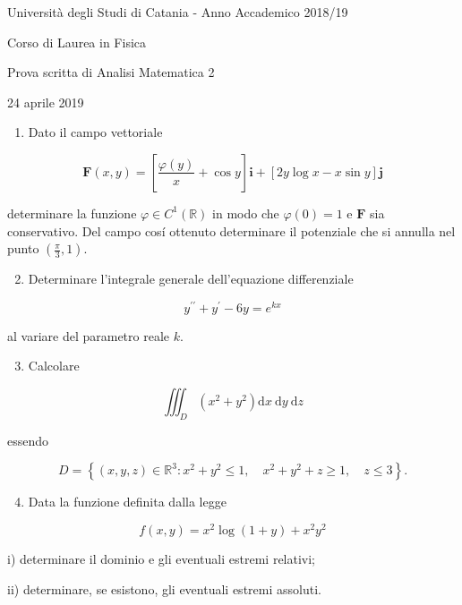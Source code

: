 \documentclass[10pt]{article}
\begin{document}
Università degli Studi di Catania - Anno Accademico 2018/19

Corso di Laurea in Fisica

Prova scritta di Analisi Matematica 2

24 aprile 2019

\begin{enumerate}
  \item Dato il campo vettoriale
\end{enumerate}

\[
\mathbf{F}(x, y)=\left[\frac{\varphi(y)}{x}+\cos y\right] \mathbf{i}+[2 y \log x-x \sin y] \mathbf{j}
\]

determinare la funzione \(\varphi \in C^{1}(\mathbb{R})\) in modo che \(\varphi(0)=1\) e \(\mathbf{F}\) sia conservativo. Del campo cosí ottenuto determinare il potenziale che si annulla nel punto \(\left(\frac{\pi}{3}, 1\right)\).

\begin{enumerate}
  \setcounter{enumi}{1}
  \item Determinare l'integrale generale dell'equazione differenziale
\end{enumerate}

\[
y^{\prime \prime}+y^{\prime}-6 y=e^{k x}
\]

al variare del parametro reale \(k\).

\begin{enumerate}
  \setcounter{enumi}{2}
  \item Calcolare
\end{enumerate}

\[
\iiint_{D}\left(x^{2}+y^{2}\right) \mathrm{d} x \mathrm{~d} y \mathrm{~d} z
\]

essendo

\[
D=\left\{(x, y, z) \in \mathbb{R}^{3}: x^{2}+y^{2} \leq 1, \quad x^{2}+y^{2}+z \geq 1, \quad z \leq 3\right\} .
\]

\begin{enumerate}
  \setcounter{enumi}{3}
  \item Data la funzione definita dalla legge
\end{enumerate}

\[
f(x, y)=x^{2} \log (1+y)+x^{2} y^{2}
\]

i) determinare il dominio e gli eventuali estremi relativi;

ii) determinare, se esistono, gli eventuali estremi assoluti.
\end{document}
